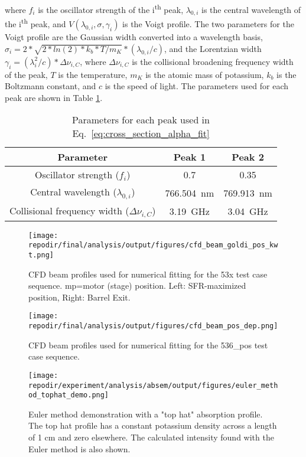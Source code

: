 where $f_i$ is the oscillator strength of the i\textsuperscript{th} peak, $\lambda_{0,i}$ is the central wavelength of the i\textsuperscript{th} peak, and $V(\lambda_{0,i},\sigma,\gamma_i)$ is the Voigt profile. The two parameters for the Voigt profile are the Gaussian width converted into a wavelength basis, $\sigma_i = 2*\sqrt{2*ln(2)*k_b*T/m_K}*(\lambda_{0,i}/c)$, and the Lorentzian width $\gamma_i = (\lambda_i^2/c)*\Delta \nu_{i,C}$, where $\Delta \nu_{i,C}$ is the collisional broadening frequency width of the peak, $T$ is the temperature, $m_K$ is the atomic mass of potassium, $k_b$ is the Boltzmann constant, and $c$ is the speed of light. The parameters used for each peak are shown in Table \ref{table:peak_parameters}. 

\begin{table}[H]
\centering
\caption{Parameters for each peak used in Eq.\ \ref{eq:cross_section_alpha_fit}}
\begin{tabular}{|c|c|c|}
\hline
Parameter & Peak 1 & Peak 2 \\
\hline
Oscillator strength ($f_i$) & 0.7 & 0.35 \\
Central wavelength ($\lambda_{0,i}$) & \SI{766.504} {\nano\meter} & \SI{769.913} {\nano\meter} \\
Collisional frequency width ($\Delta \nu_{i,C}$) & \SI{3.19} {\giga\hertz} & \SI{3.04} {\giga\hertz} \\
\hline
\end{tabular}
\label{table:peak_parameters}
\end{table}


\begin{figure}[]
    \centering
    \texttt{[image: \\repodir/final/analysis/output/figures/cfd\_beam\_goldi\_pos\_kwt.png]}
    \caption{CFD beam profiles used for numerical fitting for the 53x test case sequence. mp=motor (stage) position. Left: SFR-maximized position, Right: Barrel Exit.}
    \label{fig:SI_cfd_beam_goldi_pos_kwt}

    \texttt{[image: \\repodir/final/analysis/output/figures/cfd\_beam\_pos\_dep.png]}
    \caption{CFD beam profiles used for numerical fitting for the 536\_pos test case sequence.}
    \label{fig:SI_cfd_beam_pos_dep}
\end{figure}


\begin{figure}[]
    \centering
    \texttt{[image: \\repodir/experiment/analysis/absem/output/figures/euler\_method\_tophat\_demo.png]}
    \caption{Euler method demonstration with a "top hat" absorption profile. The top hat profile has a constant potassium density across a length of 1 cm and zero elsewhere. The calculated intensity found with the Euler method is also shown.}
    \label{fig:SI_euler_method_tophat_demo}
\end{figure}


